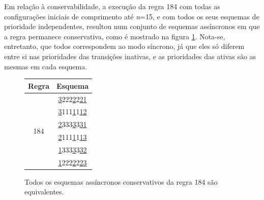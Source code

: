\documentclass[a4paper,12pt]{ltxdoc}
\newcommand\tab[1][1cm]{\hspace*{#1}}
\begin{document}
\tab Em relação à conservabilidade, a execução da regra 184 com todas as configurações iniciais de comprimento até \textit{n}=15, e com todos os seus esquemas de prioridade independentes, resultou num conjunto de esquemas assíncronos em que a regra permanece conservativa, como é mostrado na figura \ref{fig:evolucoes}. Nota-se, entretanto, que todos correspondem ao modo síncrono, já que eles só diferem entre si nas prioridades das transições inativas, e as prioridades das ativas são as mesmas em cada esquema.

\begin{figure}[h]
  \begin{minipage}[htb]{.4\linewidth}
    \centering
    \caption{Todos os esquemas assíncronos conservativos da regra 184 são equivalentes.}
    \label{fig:evolucoes}
  \end{minipage}%
  \begin{minipage}[htb]{.6\linewidth}
    \centering
    \begin{tabular}{ | c | c | } \hline
      Regra & Esquema  \\\hline 
      \multirow{13}{*}{184} 
	    & \underline{3}222\underline{2}2\underline{21} \\
	    & \underline{3}111\underline{1}1\underline{12} \\      
	    & \underline{2}333\underline{3}3\underline{31} \\      
	    & \underline{2}111\underline{1}1\underline{13} \\      
	    & \underline{1}333\underline{3}3\underline{32} \\      
	    & \underline{1}222\underline{2}2\underline{23} \\      

\end{tabular}
\end{minipage}
\end{figure}
\end{document}

